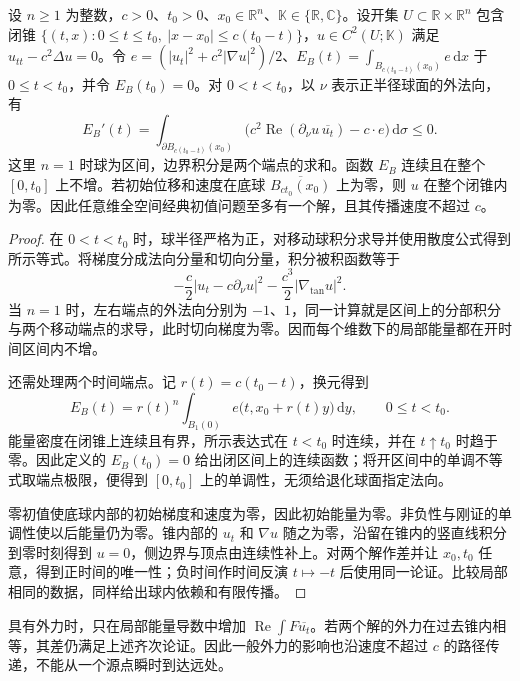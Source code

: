\begin{proposition}[波方程的局部能量]\label{b2:prop:11-local-energy}
设 \(n\geq1\) 为整数，\(c>0\)、\(t_0>0\)、\(x_0\in\mathbb R^n\)、\(\mathbb K\in\{\mathbb R,\mathbb C\}\)。设开集 \(U\subset\mathbb R\times\mathbb R^n\) 包含闭锥 \(\{(t,x):0\leq t\leq t_0,\ |x-x_0|\leq c(t_0-t)\}\)，\(u\in C^2(U;\mathbb K)\) 满足 \(u_{tt}-c^2\Delta u=0\)。令 \(e=(|u_t|^2+c^2|\nabla u|^2)/2\)、\(E_B(t)=\int_{B_{c(t_0-t)}(x_0)}e\,\mathrm dx\) 于 \(0\leq t<t_0\)，并令 \(E_B(t_0)=0\)。对 \(0<t<t_0\)，以 \(\nu\) 表示正半径球面的外法向，有
\[
 E_B'(t)=\int_{\partial B_{c(t_0-t)}(x_0)}
 \bigl(c^2\operatorname{Re}(\partial_\nu u\,\overline{u_t})-c\cdot e\bigr)
 \,\mathrm{d}\sigma\leq0.
\]
这里 \(n=1\) 时球为区间，边界积分是两个端点的求和。函数 \(E_B\) 连续且在整个 \([0,t_0]\) 上不增。若初始位移和速度在底球 \(\overline{B_{ct_0}(x_0)}\) 上为零，则 \(u\) 在整个闭锥内为零。因此任意维全空间经典初值问题至多有一个解，且其传播速度不超过 \(c\)。
\end{proposition}
\begin{proof}
在 \(0<t<t_0\) 时，球半径严格为正，对移动球积分求导并使用散度公式得到所示等式。将梯度分成法向分量和切向分量，积分被积函数等于
\[
 -\dfrac c2|u_t-c\partial_\nu u|^2
 -\dfrac{c^3}{2}|\nabla_{\mathrm{tan}}u|^2.
\]
当 \(n=1\) 时，左右端点的外法向分别为 \(-1\)、\(1\)，同一计算就是区间上的分部积分与两个移动端点的求导，此时切向梯度为零。因而每个维数下的局部能量都在开时间区间内不增。

还需处理两个时间端点。记 \(r(t)=c(t_0-t)\)，换元得到
\[
 E_B(t)=r(t)^n\int_{B_1(0)}e\bigl(t,x_0+r(t)y\bigr)\,\mathrm{d}y,
 \qquad 0\leq t<t_0.
\]
能量密度在闭锥上连续且有界，所示表达式在 \(t<t_0\) 时连续，并在 \(t\uparrow t_0\) 时趋于零。因此定义的 \(E_B(t_0)=0\) 给出闭区间上的连续函数；将开区间中的单调不等式取端点极限，便得到 \([0,t_0]\) 上的单调性，无须给退化球面指定法向。

零初值使底球内部的初始梯度和速度为零，因此初始能量为零。非负性与刚证的单调性使以后能量仍为零。锥内部的 \(u_t\) 和 \(\nabla u\) 随之为零，沿留在锥内的竖直线积分到零时刻得到 \(u=0\)，侧边界与顶点由连续性补上。对两个解作差并让 \(x_0,t_0\) 任意，得到正时间的唯一性；负时间作时间反演 \(t\mapsto-t\) 后使用同一论证。比较局部相同的数据，同样给出球内依赖和有限传播。
\end{proof}

具有外力时，只在局部能量导数中增加 \(\operatorname{Re}\int F\overline{u_t}\)。若两个解的外力在过去锥内相等，其差仍满足上述齐次论证。因此一般外力的影响也沿速度不超过 \(c\) 的路径传递，不能从一个源点瞬时到达远处。

